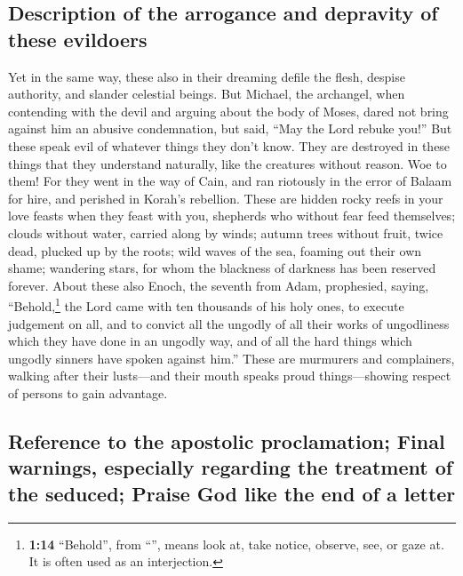 \hypertarget{description-of-the-arrogance-and-depravity-of-these-evildoers}{%
\subsection{Description of the arrogance and depravity of these
evildoers}\label{description-of-the-arrogance-and-depravity-of-these-evildoers}}

 Yet in the same way, these also in their dreaming defile
the flesh, despise authority, and slander celestial beings.
 But Michael, the archangel, when contending with the
devil and arguing about the body of Moses, dared not bring against him
an abusive condemnation, but said, ``May the Lord rebuke you!''
 But these speak evil of whatever things they don't know.
They are destroyed in these things that they understand naturally, like
the creatures without reason.  Woe to them! For they went
in the way of Cain, and ran riotously in the error of Balaam for hire,
and perished in Korah's rebellion.  These are hidden
rocky reefs in your love feasts when they feast with you, shepherds who
without fear feed themselves; clouds without water, carried along by
winds; autumn trees without fruit, twice dead, plucked up by the roots;
 wild waves of the sea, foaming out their own shame;
wandering stars, for whom the blackness of darkness has been reserved
forever.  About these also Enoch, the seventh from Adam,
prophesied, saying, ``Behold,\footnote{\textbf{1:14} ``Behold'', from
  ``'', means look at, take notice, observe, see, or gaze
  at. It is often used as an interjection.} the Lord came with ten
thousands of his holy ones,  to execute judgement on all,
and to convict all the ungodly of all their works of ungodliness which
they have done in an ungodly way, and of all the hard things which
ungodly sinners have spoken against him.''  These are
murmurers and complainers, walking after their lusts---and their mouth
speaks proud things---showing respect of persons to gain advantage.

\hypertarget{reference-to-the-apostolic-proclamation-final-warnings-especially-regarding-the-treatment-of-the-seduced-praise-god-like-the-end-of-a-letter}{%
\subsection{Reference to the apostolic proclamation; Final warnings,
especially regarding the treatment of the seduced; Praise God like the
end of a
letter}\label{reference-to-the-apostolic-proclamation-final-warnings-especially-regarding-the-treatment-of-the-seduced-praise-god-like-the-end-of-a-letter}}

